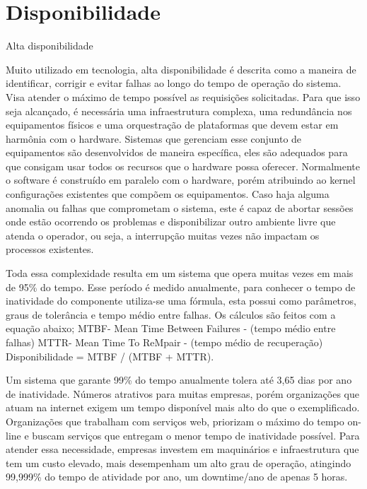 \chapter{Disponibilidade}

Alta disponibilidade

Muito utilizado em tecnologia, alta disponibilidade é descrita como a maneira de identificar, corrigir e evitar falhas ao longo do tempo de operação do sistema. Visa atender o máximo de tempo possível as requisições solicitadas. Para que isso seja alcançado, é necessária uma infraestrutura complexa, uma redundância nos equipamentos físicos e uma orquestração de plataformas que devem estar em harmônia com o hardware. Sistemas que gerenciam esse conjunto de equipamentos são desenvolvidos de maneira específica, eles são adequados para que consigam usar todos os recursos que o hardware possa oferecer. Normalmente o software é construído em paralelo com o hardware, porém atribuindo ao kernel configurações existentes que compõem os equipamentos. 
Caso haja alguma anomalia ou falhas que comprometam o sistema, este é capaz de abortar sessões onde estão ocorrendo os problemas e disponibilizar outro ambiente livre que atenda o operador, ou seja, a interrupção muitas vezes não impactam os processos existentes.


Toda essa complexidade resulta em um sistema que opera muitas vezes em mais de 95\% do tempo. Esse período é medido anualmente, para conhecer o tempo de inatividade do componente utiliza-se uma fórmula, esta possui como parâmetros, graus de tolerância e tempo médio entre falhas. Os cálculos são feitos com a equação abaixo;
MTBF- Mean Time Between Failures - (tempo médio entre falhas)
MTTR- Mean Time To ReMpair - (tempo médio de recuperação)
Disponibilidade = MTBF / (MTBF + MTTR).


Um sistema que garante 99\% do tempo anualmente tolera até 3,65 dias por ano de inatividade. Números atrativos para muitas empresas, porém organizações que atuam na internet exigem um tempo disponível mais alto do que o exemplificado. Organizações que trabalham com serviços web, priorizam o máximo do tempo on-line e buscam serviços que entregam o menor tempo de inatividade possível. Para atender essa necessidade, empresas investem em maquinários e infraestrutura que tem um custo elevado, mais desempenham um alto grau de operação, atingindo 99,999\% do tempo de atividade por ano, um downtime/ano de apenas 5 horas.


